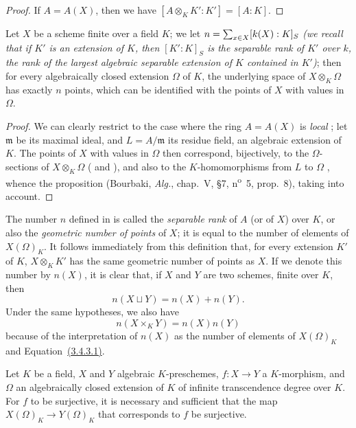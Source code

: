 \begin{proof}
\label{proof-1.6.4.6}
If $A=A(X)$, then we have $[A\otimes_K K':K']=[A:K]$.
\end{proof}

\begin{corollary}[6.4.7]
\label{I.6.4.7}
Let $X$ be a scheme finite over a field $K$;
we let $n=\sum_{x\in X}[k(X):K]_S$ \emph{(we recall that if $K'$ is an extension of $K$, then $[K':K]_S$ is the \emph{separable rank} of $K'$ over $k$, the rank of the largest algebraic separable extension of $K$ contained in $K'$)};
then
for every algebraically closed extension $\Omega$ of $K$, the underlying space of $X\otimes_K\Omega$ has exactly $n$ points, which can be identified with the points of $X$ with values in $\Omega$.
\end{corollary}

\begin{proof}
\label{proof-1.6.4.7}
We can clearly restrict to the case where the ring $A=A(X)$ is \emph{local} ;
let $\mathfrak{m}$ be its maximal ideal, and $L=A/\mathfrak{m}$ its residue field, an algebraic extension of $K$.
The points of $X$ with values in $\Omega$ then correspond, bijectively, to the $\Omega$-sections of $X\otimes_K\Omega$ ( and ), and also to the $K$-homomorphisms from $L$ to $\Omega$ , whence the proposition (Bourbaki, \emph{Alg.}, chap.~V, §7, n\textsuperscript{o}~5, prop.~8), taking  into account.
\end{proof}

\begin{env}[6.4.8]
\label{I.6.4.8}
The number $n$ defined in  is called the \emph{separable rank} of $A$ (or of $X$) over $K$, or also the \emph{geometric number of points} of $X$;
it is equal to the number of elements of $X(\Omega)_K$.
It follows immediately from this definition that, for every extension $K'$ of $K$, $X\otimes_K K'$ has the same geometric number of points as $X$.
If we denote this number by $n(X)$, it is clear that, if $X$ and $Y$ are two schemes, finite over $K$, then
\[
    n(X\sqcup Y)=n(X)+n(Y).\tag{6.4.8.1}
\]
Under the same hypotheses, we also have
\[
    n(X\times_K Y)=n(X)n(Y)\tag{6.4.8.2}
\]
because of the interpretation of $n(X)$ as the number of elements of $X(\Omega)_K$ and Equation~\hyperref[1.3.4.3]{(3.4.3.1)}.
\end{env}

\begin{proposition}[6.4.9]
\label{I.6.4.9}
Let $K$ be a field, $X$ and $Y$ algebraic $K$-preschemes, $f:X\to Y$ a $K$-morphism, and $\Omega$ an algebraically closed extension of $K$ of infinite transcendence degree over $K$.
For $f$ to be surjective, it is necessary and sufficient that the map $X(\Omega)_K\to Y(\Omega)_K$ that corresponds to $f$  be surjective.
\end{proposition}

